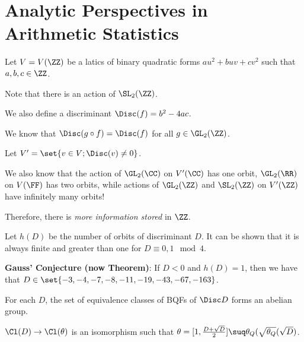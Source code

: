 \documentclass[11pt]{scrartcl}
\begin{document}
\section{Analytic Perspectives in Arithmetic Statistics}

Let $V = V(\ZZ)$ be a latics of binary quadratic forms $au^2+buv+cv^2$ such that $a, b, c\in \ZZ$.

Note that there is an action of $\SL_2(\ZZ)$. 

We also define a discriminant $\Disc(f) = b^2-4ac$.

We know that $\Disc(g\circ f) = \Disc(f)$ for all $g\in\GL_2(\ZZ)$.

Let $V' = \set{v\in V; \Disc(v) \neq 0}$.

We also know that the action of $\GL_2(\CC)$ on $V'(\CC)$ has one orbit, $\GL_2(\RR)$ on $V(\FF)$ has two orbits, while actions of $\GL_{2}(\ZZ)$ and $\SL_2(\ZZ)$ on $V'(\ZZ)$ have infinitely many orbits!

Therefore, there is \textsl{more information stored} in $\ZZ$.

Let $h(D)$ be  the number of orbits of discriminant $D$. It can be shown that it is always finite and greater than one for $D \equiv 0, 1 \mod 4$.

\textbf{Gauss' Conjecture (now Theorem)}: If $D < 0$ and $h(D) = 1$,
then we have that $D\in \set{-3, -4, -7 , -8, -11, -19, -43, -67, -163}$.

\begin{theorem}

For each $D$, the set of equivalence classes of BQFs of $\Disc D$  forms an abelian group.
\end{theorem}

\begin{remark}
$\Cl (D) \to \Cl(\theta)$ is an isomorphism such that
$\theta = [1, \frac{D+\sqrt{D}}{2}]\suq
\theta_Q(\sqrt{\theta_Q}(\sqrt{D})$.
\end{remark}
\end{document}
